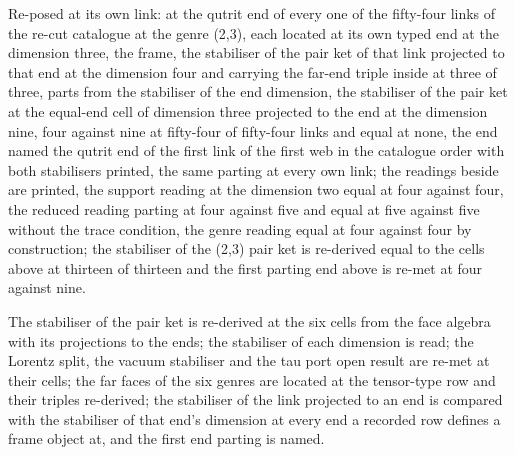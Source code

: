 \begin{chwall}
Re-posed at its own link: at the qutrit end of every one of the fifty-four links of the re-cut catalogue at the genre (2,3), each located at its own typed end at the dimension three, the frame, the stabiliser of the pair ket of that link projected to that end at the dimension four and carrying the far-end triple inside at three of three, parts from the stabiliser of the end dimension, the stabiliser of the pair ket at the equal-end cell of dimension three projected to the end at the dimension nine, four against nine at fifty-four of fifty-four links and equal at none, the end named the qutrit end of the first link of the first web in the catalogue order with both stabilisers printed, the same parting at every own link; the readings beside are printed, the support reading at the dimension two equal at four against four, the reduced reading parting at four against five and equal at five against five without the trace condition, the genre reading equal at four against four by construction; the stabiliser of the (2,3) pair ket is re-derived equal to the cells above at thirteen of thirteen and the first parting end above is re-met at four against nine.
\end{chwall}
The stabiliser of the pair ket is re-derived at the six cells from the face algebra with its projections to the ends; the stabiliser of each dimension is read; the Lorentz split, the vacuum stabiliser and the tau port open result are re-met at their cells; the far faces of the six genres are located at the tensor-type row and their triples re-derived; the stabiliser of the link projected to an end is compared with the stabiliser of that end's dimension at every end a recorded row defines a frame object at, and the first end parting is named.

